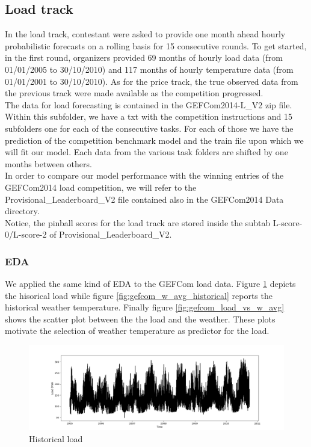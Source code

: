 \subsection{Load track}
In the load track, contestant were asked to provide one month ahead hourly probabilistic forecasts on a rolling basis for 15 consecutive rounds. To get started, in the first round, organizers provided 69 months of hourly load data (from 01/01/2005 to 30/10/2010) and 117 months of hourly temperature data (from 01/01/2001 to 30/10/2010). 
As for the price track, the true observed data from the previous track were made available as the competition progressed.
\\
The data for load forecasting is contained in the GEFCom2014-L\_V2 zip file. Within this subfolder, we have a txt with the competition instructions and 15 subfolders one for each of the consecutive tasks. For each of those we have the prediction of the competition benchmark model and the train file upon which we will fit our model.
Each data from the various task folders are shifted by one months between others.
\\
In order to compare our model performance with the winning entries of the GEFCom2014 load competition, we will refer to the Provisional\_Leaderboard\_V2 file contained also in the GEFCom2014 Data directory.
\\
Notice, the pinball scores for the load track are stored inside the subtab L-score-0/L-score-2 of Provisional\_Leaderboard\_V2.
\subsubsection{EDA}
We applied the same kind of EDA to the GEFCom load data. Figure \ref{fig:gefcom_load_historical} depicts the hisorical load while figure \ref{fig:gefcom_w_avg_historical} reports the historical weather temperature. Finally figure \ref{fig:gefcom_load_vs_w_avg} shows the scatter plot between the the load and the weather.
These plots motivate the selection of weather temperature as predictor for the load.

\begin{figure}[!h]
    \includegraphics[width=\textwidth]{images/gefcom_load_historical.png}
    \caption{Historical load}
    \label{fig:gefcom_load_historical}
\end{figure}

